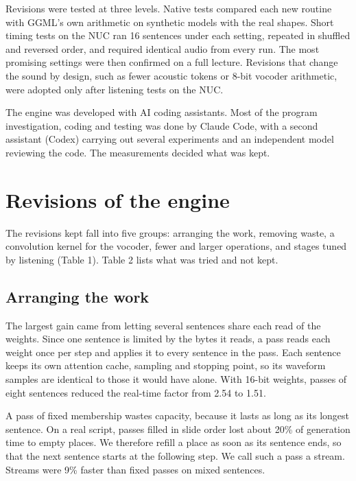 \documentclass[11pt]{article}
\begin{document}
Revisions were tested at three levels. Native tests compared each new
routine with GGML's own arithmetic on synthetic models with the real
shapes. Short timing tests on the NUC ran 16 sentences under each
setting, repeated in shuffled and reversed order, and required identical
audio from every run. The most promising settings were then confirmed on
a full lecture. Revisions that change the sound by design, such as fewer
acoustic tokens or 8-bit vocoder arithmetic, were adopted only after
listening tests on the NUC.

The engine was developed with AI coding assistants. Most of the program
investigation, coding and testing was done by Claude Code, with a second
assistant (Codex) carrying out several experiments and an independent
model reviewing the code. The measurements decided what was kept.

\hypertarget{revisions-of-the-engine}{%
\section{Revisions of the engine}\label{revisions-of-the-engine}}

The revisions kept fall into five groups: arranging the work, removing
waste, a convolution kernel for the vocoder, fewer and larger
operations, and stages tuned by listening (Table 1). Table 2 lists what
was tried and not kept.

\hypertarget{arranging-the-work}{%
\subsection{Arranging the work}\label{arranging-the-work}}

The largest gain came from letting several sentences share each read of
the weights. Since one sentence is limited by the bytes it reads, a pass
reads each weight once per step and applies it to every sentence in the
pass. Each sentence keeps its own attention cache, sampling and stopping
point, so its waveform samples are identical to those it would have
alone. With 16-bit weights, passes of eight sentences reduced the
real-time factor from 2.54 to 1.51.

A pass of fixed membership wastes capacity, because it lasts as long as
its longest sentence. On a real script, passes filled in slide order
lost about 20\% of generation time to empty places. We therefore refill
a place as soon as its sentence ends, so that the next sentence starts
at the following step. We call such a pass a stream. Streams were 9\%
faster than fixed passes on mixed sentences.
\end{document}
